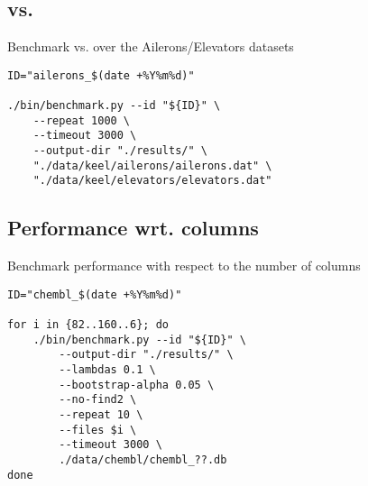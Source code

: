 \subsection{\Find vs. \PresQ}

\begin{code}
\label{script:edd_finding}
\caption{Benchmark \Find vs. \PresQ over the Ailerons/Elevators datasets}
\begin{verbatim}
ID="ailerons_$(date +%Y%m%d)"

./bin/benchmark.py --id "${ID}" \
    --repeat 1000 \
    --timeout 3000 \
    --output-dir "./results/" \
    "./data/keel/ailerons/ailerons.dat" \
    "./data/keel/elevators/elevators.dat"
\end{verbatim}
\end{code}

\subsection{Performance wrt. columns}

\begin{code}
\label{script:perf_columns}
\caption{Benchmark performance with respect to the number of columns}
\begin{verbatim}
ID="chembl_$(date +%Y%m%d)"

for i in {82..160..6}; do
    ./bin/benchmark.py --id "${ID}" \
        --output-dir "./results/" \
        --lambdas 0.1 \
        --bootstrap-alpha 0.05 \
        --no-find2 \
        --repeat 10 \
        --files $i \
        --timeout 3000 \
        ./data/chembl/chembl_??.db
done
\end{verbatim}
\end{code}
